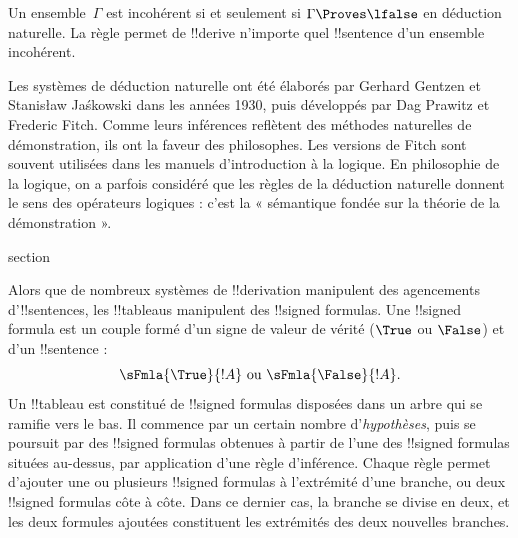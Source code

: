 \documentclass[11pt,a4paper,openany]{memoir}
\begin{document}
Un ensemble~$\Gamma$ est incohérent si et seulement si
$\Gamma \Proves \lfalse$ en déduction naturelle. La règle \FalseInt{}
permet de !!{derive} n'importe quel !!{sentence} d'un ensemble incohérent.

Les systèmes de déduction naturelle ont été élaborés par Gerhard Gentzen
et Stanis\l{}aw Ja\'skowski dans les années 1930, puis développés
par Dag Prawitz et Frederic Fitch. Comme leurs inférences reflètent
des méthodes naturelles de démonstration, ils ont la faveur des
philosophes. Les versions de Fitch sont souvent utilisées dans les
manuels d'introduction à la logique. En philosophie de la logique,
on a parfois considéré que les règles de la déduction naturelle donnent
le sens des opérateurs logiques : c'est la « sémantique fondée sur la
théorie de la démonstration ».


\endgroup



\begingroup
\expandafter\def\csname ol@sectioncs\endcsname{section}
\def\olfilename{tableaux}


      {}
      {}


Alors que de nombreux systèmes de !!{derivation} manipulent des
agencements d'!!{sentence}s, les !!{tableau}s manipulent des
!!{signed formula}s. Une !!{signed formula} est un couple formé d'un
signe de valeur de vérité ($\True$ ou $\False$) et d'un !!{sentence} :
\[
\sFmla{\True}{!A} \text{ ou } \sFmla{\False}{!A}.
\]
Un !!{tableau} est constitué de !!{signed formula}s disposées dans un
arbre qui se ramifie vers le bas. Il commence par un certain nombre
d'\emph{hypothèses}, puis se poursuit par des !!{signed formula}s
obtenues à partir de l'une des !!{signed formula}s situées au-dessus,
par application d'une règle d'inférence. Chaque règle permet d'ajouter
une ou plusieurs !!{signed formula}s à l'extrémité d'une branche,
ou deux !!{signed formula}s côte à côte. Dans ce dernier cas, la branche
se divise en deux, et les deux formules ajoutées constituent les
extrémités des deux nouvelles branches.
\end{document}
